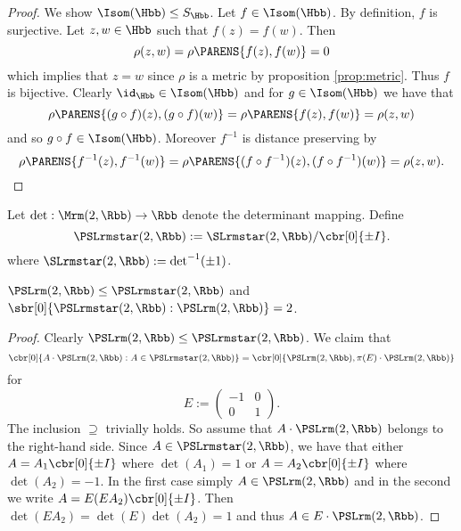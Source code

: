 \begin{proof}
	We show $\Isom(\Hbb) \leq S_\Hbb$. Let $f \in \Isom(\Hbb)$. By definition,	$f$ is surjective. Let $z,w \in \Hbb$ such that $f(z) = f(w)$. Then 
	\begin{equation*}
		\rho(z,w) = \rho\PARENS{f(z),f(w)} = 0
	\end{equation*}
	\noindent which implies that $z = w$ since $\rho$ is a metric by proposition \ref{prop:metric}. Thus $f$ is bijective. Clearly $\id_\Hbb \in \Isom(\Hbb)$ and for $g \in \Isom(\Hbb)$ we have that
	\begin{equation*}
		\rho\PARENS{(g \circ f)(z),(g\circ f)(w)} = \rho\PARENS{f(z),f(w)} = \rho(z,w) 
	\end{equation*}
	\noindent and so $g \circ f \in \Isom(\Hbb)$. Moreover $f^{-1}$ is distance preserving by
	\begin{equation*}
		\rho\PARENS{f^{-1}(z),f^{-1}(w)} = \rho\PARENS{(f \circ f^{-1})(z), (f \circ f^{-1})(w)} = \rho(z,w).
	\end{equation*}
\end{proof}

\begin{definition}
	Let $\det : \Mrm(2,\Rbb) \to \Rbb$ denote the determinant mapping. Define 
	\begin{equation}
		\PSLrmstar(2,\Rbb) := \SLrmstar(2,\Rbb)/\cbr[0]{\pm I}.
	\end{equation}
	\noindent where $\SLrmstar(2,\Rbb) := \det^{-1}(\pm 1)$.
\end{definition}

\begin{proposition}
	$\PSLrm(2,\Rbb) \leq \PSLrmstar(2,\Rbb)$ and $\sbr[0]{\PSLrmstar(2,\Rbb) : \PSLrm(2,\Rbb)} = 2$.
	\label{prop:index}
\end{proposition}

\begin{proof}
	Clearly $\PSLrm(2,\Rbb) \leq \PSLrmstar(2,\Rbb)$. We claim that
	\begin{equation*}
		\cbr[0]{A \cdot \PSLrm(2,\Rbb) : A \in \PSLrmstar(2,\Rbb)} = \cbr[0]{\PSLrm(2,\Rbb), \pi(E) \cdot \PSLrm(2,\Rbb)}
	\end{equation*}
	\noindent for 
	\begin{equation*}
		E := \begin{pmatrix}
			-1 & 0\\
			0 & 1
		\end{pmatrix}.
	\end{equation*}
	The inclusion $\supseteq$ trivially holds. So assume that $A \cdot \PSLrm(2,\Rbb)$ belongs to the right-hand side. Since $A \in \PSLrmstar(2,\Rbb)$, we have that either $A = A_1\cbr[0]{\pm I}$ where $\det(A_1) = 1$ or $A = A_2 \cbr[0]{\pm I}$ where $\det(A_2) = -1$. In the first case simply $A \in \PSLrm(2,\Rbb)$ and in the second we write $A = E(EA_2)\cbr[0]{\pm I}$. Then $\det(EA_2) = \det(E)\det(A_2) = 1$ and thus $A \in E \cdot \PSLrm(2,\Rbb)$.
\end{proof}

